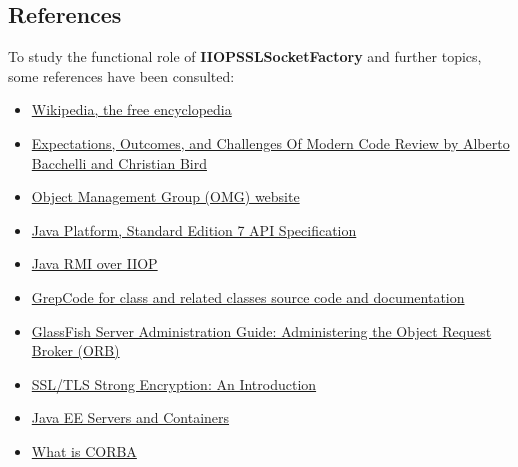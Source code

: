 \subsection{References}
To study the functional role of \textbf{IIOPSSLSocketFactory} and further topics, some references have been consulted:
\begin{itemize}
	\item \href{https://www.wikipedia.org/}{Wikipedia, the free encyclopedia}
	\item \href{http://research.microsoft.com/pubs/180283/ICSE\%202013-codereview.pdf}{Expectations, Outcomes, and Challenges Of Modern Code Review by Alberto Bacchelli and Christian Bird}
	\item \href{http://www.omg.org/}{Object Management Group (OMG) website}
	\item \href{http://docs.oracle.com/javase/7/docs/api/overview-summary.html}{Java Platform, Standard Edition 7 API Specification}
	\item \href{http://docs.oracle.com/javase/7/docs/technotes/guides/rmi-iiop/index.html}{Java RMI over IIOP}
	\item \href{http://grepcode.com/file/repo1.maven.org/maven2/org.glassfish.main.orb/orb-iiop/4.0/org/glassfish/enterprise/iiop/impl/IIOPSSLSocketFactory.java}{GrepCode for class and related classes source code and documentation}  
	\item \href{http://docs.oracle.com/cd/E26576_01/doc.312/e24928/orb.htm\#GSADG00018}{GlassFish Server Administration Guide: Administering the Object Request Broker (ORB)}
	\item \href{https://httpd.apache.org/docs/trunk/ssl/ssl_intro.html}{SSL/TLS Strong Encryption: An Introduction}
	\item \href{https://docs.oracle.com/javaee/7/firstcup/java-ee002.htm}{Java EE Servers and Containers}
	\item 
	\href{http://franz.com/resources/corba/white_papers/corba_white_paper.lhtml}{What is CORBA}
\end{itemize}